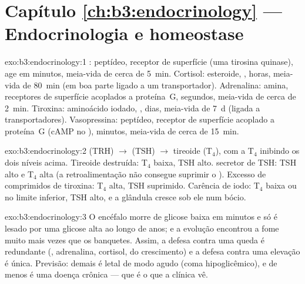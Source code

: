 \section*{Capítulo \ref{ch:b3:endocrinology} --- Endocrinologia e homeostase}

\begin{solution}{exo:b3:endocrinology:1}
: peptídeo, receptor de superfície (uma tirosina quinase), age
em minutos, meia-vida de cerca de \qty{5}{min}. Cortisol: esteroide,
, horas, meia-vida de \qty{80}{min} (em boa parte ligado
a um transportador). Adrenalina: amina, receptores de superfície
acoplados a proteína~G, segundos, meia-vida de cerca de \qty{2}{min}.
Tiroxina: aminoácido iodado, , dias, meia-vida de
\qty{7}{d} (ligada a transportadores). Vasopressina: peptídeo,
receptor de superfície acoplado a proteína~G (cAMP no ),
minutos, meia-vida de cerca de \qty{15}{min}.
\end{solution}

\begin{solution}{exo:b3:endocrinology:2}
 (TRH) $\to$  (TSH) $\to$ tireoide (T$_{4}$), com a
T$_{4}$ inibindo os dois níveis acima. Tireoide destruída: T$_{4}$
baixa, TSH alto.  secretor de TSH: TSH alto e T$_{4}$ alta (a
retroalimentação não consegue suprimir o ). Excesso de comprimidos
de tiroxina: T$_{4}$ alta, TSH suprimido. Carência de iodo: T$_{4}$
baixa ou no limite inferior, TSH alto, e a glândula cresce sob ele num
bócio.
\end{solution}

\begin{solution}{exo:b3:endocrinology:3}
O encéfalo morre de glicose baixa em minutos e só é lesado por uma
glicose alta ao longo de anos; e a evolução encontrou a fome muito mais
vezes que os banquetes. Assim, a defesa contra uma queda é redundante
(, adrenalina, cortisol,  do crescimento) e a defesa
contra uma elevação é única. Previsão:  demais é letal de modo
agudo (coma hipoglicêmico), e de menos é uma doença crônica --- que é o
que a clínica vê.
\end{solution}

